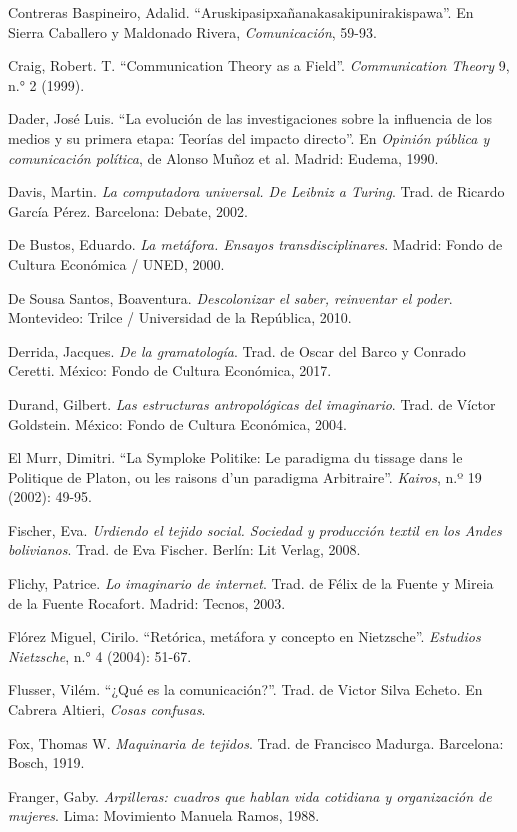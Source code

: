 \documentclass{tufte-handout}
\begin{document}
\begin{hangparas}{.25in}{1}
Contreras Baspineiro, Adalid. ``Aruskipasipxañanakasakipunirakispawa''.
En Sierra Caballero y Maldonado Rivera, \emph{Comunicación}, 59-93.

Craig, Robert. T. ``Communication Theory as a Field''.
\emph{Communication Theory} 9, n.° 2 (1999).

Dader, José Luis. ``La evolución de las investigaciones sobre la
influencia de los medios y su primera etapa: Teorías del impacto
directo''. En \emph{Opinión pública y comunicación política}, de Alonso
Muñoz et al. Madrid: Eudema, 1990.

Davis, Martin. \emph{La computadora universal. De Leibniz a Turing}.
Trad. de Ricardo García Pérez. Barcelona: Debate, 2002.

De Bustos, Eduardo. \emph{La metáfora. Ensayos transdisciplinares}.
Madrid: Fondo de Cultura Económica / UNED, 2000.

De Sousa Santos, Boaventura. \emph{Descolonizar el saber, reinventar el
poder}. Montevideo: Trilce / Universidad de la República, 2010.

Derrida, Jacques. \emph{De la gramatología}. Trad. de Oscar del Barco y
Conrado Ceretti. México: Fondo de Cultura Económica, 2017.

Durand, Gilbert. \emph{Las estructuras antropológicas del imaginario}.
Trad. de Víctor Goldstein. México: Fondo de Cultura Económica, 2004.

El Murr, Dimitri. ``La Symploke Politike: Le paradigma du tissage dans
le Politique de Platon, ou les raisons d'un paradigma Arbitraire''.
\emph{Kairos}, n.º 19 (2002): 49-95.

Fischer, Eva. \emph{Urdiendo el tejido social. Sociedad y producción
textil en los Andes bolivianos}. Trad. de Eva Fischer. Berlín: Lit
Verlag, 2008.

Flichy, Patrice. \emph{Lo imaginario de internet}. Trad. de Félix de la
Fuente y Mireia de la Fuente Rocafort. Madrid: Tecnos, 2003.

Flórez Miguel, Cirilo. ``Retórica, metáfora y concepto en Nietzsche''.
\emph{Estudios Nietzsche}, n.° 4 (2004): 51-67.

Flusser, Vilém. ``¿Qué es la comunicación?''. Trad. de Victor Silva
Echeto. En Cabrera Altieri, \emph{Cosas confusas}.

Fox, Thomas W. \emph{Maquinaria de tejidos}. Trad. de Francisco Madurga.
Barcelona: Bosch, 1919.

Franger, Gaby. \emph{Arpilleras: cuadros que hablan vida cotidiana y
organización de mujeres}. Lima: Movimiento Manuela Ramos, 1988.


\end{hangparas}
\end{document}
